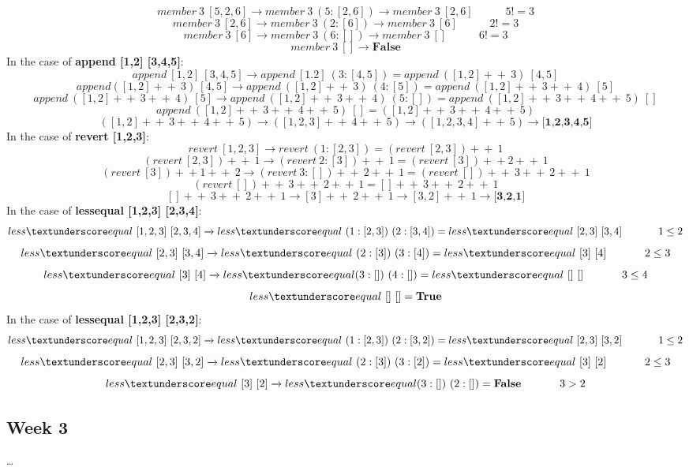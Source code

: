 \documentclass{article}
\theoremstyle{theorem}
\theoremstyle{definition}
\theoremstyle{remark}
\begin{document}
$$
member \ 3 \ [5,2,6] \xrightarrow{} member \ 3 \ (5:[2,6]) \xrightarrow{} member \ 3 \ [2,6] \hspace{35pt} 5 != 3
$$
$$
member \ 3 \ [2,6] \xrightarrow{} member \ 3 \ (2:[6]) \xrightarrow{} member \ 3 \ [6] \hspace{35pt} 2 != 3
$$
$$
member \ 3 \ [6] \xrightarrow{} member \ 3 \ (6:[]) \xrightarrow{} member \ 3 \ [] \hspace{35pt} 6 != 3
$$
$$
member \ 3 \ [] \xrightarrow{} \textbf{False}
$$
In the case of \textbf{append [1,2] [3,4,5]}:
$$
append \ [1,2] \ [3,4,5] \xrightarrow{} append \ [1.2] \ (3:[4,5]) = append \ ([1,2] +\!+ \ 3) \ [4,5]
$$
$$
append ([1,2] +\!+ \ 3) \ [4,5] \xrightarrow{} append \ ([1,2] +\!+ \ 3) \ (4:[5]) = append \ ([1,2] +\!+ \ 3 +\!+ \ 4) \ [5]
$$
$$
append \ ([1,2] +\!+ \ 3 +\!+ \ 4) \ [5] \xrightarrow{}
append \ ([1,2] +\!+ \ 3 +\!+ \ 4) \ (5:[]) = append \ ([1,2] +\!+ \ 3 +\!+ \ 4 +\!+ \ 5) \ []
$$
$$
append \ ([1,2] +\!+ \ 3 +\!+ \ 4 +\!+ \ 5) \ [] = ([1,2] +\!+ \ 3 +\!+ \ 4 +\!+ \ 5)
$$
$$
([1,2] +\!+ \ 3 +\!+ \ 4 +\!+ \ 5) \xrightarrow{} ([1,2,3] +\!+ \ 4 +\!+ \ 5) \xrightarrow{} ([1,2,3,4] +\!+ \ 5) \xrightarrow{} \textbf{[1,2,3,4,5]}
$$
In the case of \textbf{revert [1,2,3]}:
$$
revert \ [1,2,3] \xrightarrow{} revert \ (1:[2,3]) = (revert \ [2,3]) +\!+ \ 1 
$$
$$
(revert \ [2,3]) +\!+ \ 1 \xrightarrow{} (revert \ 2:[3]) +\!+ \ 1 = (revert \ [3]) +\!+ 2 +\!+ \ 1
$$
$$
(revert \ [3]) +\!+ 1 +\!+ \ 2 \xrightarrow{} (revert \  3:[]) +\!+ \ 2 +\!+ \ 1 = (revert \ []) +\!+ \ 3 +\!+ \ 2 +\!+ \ 1
$$
$$
(revert \ []) +\!+ \ 3 +\!+ \ 2 +\!+ \ 1 = [] +\!+ \ 3 +\!+ \ 2 +\!+ \ 1
$$
$$
[] +\!+ \ 3 +\!+ \ 2 +\!+ \ 1 \xrightarrow{} [3] +\!+ \ 2 +\!+ \ 1 \xrightarrow{} [3,2] +\!+ \ 1 \xrightarrow{} \textbf{[3,2,1]}
$$
In the case of \textbf{less\textunderscore equal [1,2,3] [2,3,4]}:
$$
less\textunderscore equal \ [1,2,3] \ [2,3,4] \xrightarrow{} less\textunderscore equal \ (1:[2,3]) \ (2:[3,4]) = less\textunderscore equal \ [2,3] \ [3,4] \hspace{35pt} 1 \leq 2
$$
$$
less\textunderscore equal \ [2,3] \ [3,4] \xrightarrow{} less\textunderscore equal \ (2:[3]) \ (3:[4]) = less\textunderscore equal \ [3] \ [4] \hspace{35pt} 2 \leq 3
$$
$$
less\textunderscore equal \ [3] \ [4] \xrightarrow{} less\textunderscore equal (3:[]) \ (4:[]) = less\textunderscore equal \ [] \ [] \hspace{35pt} 3 \leq 4
$$
$$
less\textunderscore equal \ [] \ [] = \textbf{True}
$$
In the case of \textbf{less\textunderscore equal [1,2,3] [2,3,2]}:
$$
less\textunderscore equal \ [1,2,3] \ [2,3,2] \xrightarrow{} less\textunderscore equal \ (1:[2,3]) \ (2:[3,2]) = less\textunderscore equal \ [2,3] \ [3,2] \hspace{35pt} 1 \leq 2
$$
$$
less\textunderscore equal \ [2,3] \ [3,2] \xrightarrow{} less\textunderscore equal \ (2:[3]) \ (3:[2]) = less\textunderscore equal \ [3] \ [2] \hspace{35pt} 2 \leq 3
$$
$$
less\textunderscore equal \ [3] \ [2] \xrightarrow{} less\textunderscore equal (3:[]) \ (2:[]) = \textbf{False} \hspace{35pt} 3 > 2
$$

\subsection{Week 3}
\ldots
\end{document}
